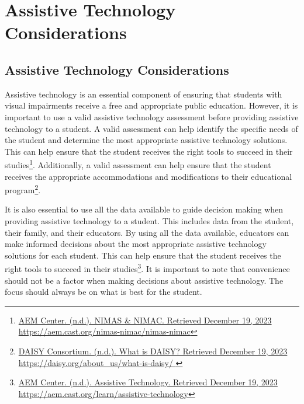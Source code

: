 \hypertarget{trouble3}{}\chapter[\raggedright Assistive Technology Considerations\hfill\break ]{Assistive Technology Considerations}\label{trouble3}
\minitoc \newpage
\hypertarget{trouble5}{}\section[Assistive Technology Considerations]{Assistive Technology Considerations}\label{trouble5}
Assistive technology is an essential component of ensuring that students with visual impairments receive a free and appropriate public education. However, it is important to use a valid assistive technology assessment before providing assistive technology to a student. A valid assessment can help identify the specific needs of the student and determine the most appropriate assistive technology solutions. This can help ensure that the student receives the right tools to succeed in their studies\footnote{\raggedright \href{https://aem.cast.org/nimas-nimac/nimas-nimac}{AEM Center. (n.d.). NIMAS \& NIMAC. Retrieved December 19, 2023} \url{https://aem.cast.org/nimas-nimac/nimas-nimac}}. Additionally, a valid assessment can help ensure that the student receives the appropriate accommodations and modifications to their educational program\footnote{\raggedright \href{https://daisy.org/about_us/what-is-daisy/ }{DAISY Consortium. (n.d.). What is DAISY? Retrieved December 19, 2023} \url{https://daisy.org/about_us/what-is-daisy/ }}.

It is also essential to use all the data available to guide decision making when providing assistive technology to a student. This includes data from the student, their family, and their educators. By using all the data available, educators can make informed decisions about the most appropriate assistive technology solutions for each student. This can help ensure that the student receives the right tools to succeed in their studies\footnote{\raggedright \href{https://aem.cast.org/learn/assistive-technology}{AEM Center. (n.d.). Assistive Technology. Retrieved December 19, 2023} \url{https://aem.cast.org/learn/assistive-technology}}. It is important to note that convenience should not be a factor when making decisions about assistive technology. The focus should always be on what is best for the student.

